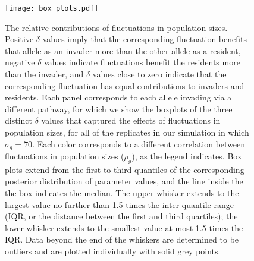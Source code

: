 \begin{figure}[H]
  \centerline{\texttt{[image: box\_plots.pdf]}}
  \caption{The relative contributions of fluctuations in population sizes. Positive $\delta$ values imply that the corresponding fluctuation benefits that allele as an invader more than the other allele as a resident, negative $\delta$ values indicate fluctuations benefit the residents more than the invader, and $\delta$ values close to zero indicate that the corresponding fluctuation has equal contributions to invaders and residents. Each panel corresponds to each allele invading via a different pathway, for which we show the boxplots of the three distinct $\delta$ values that captured the effects of fluctuations in population sizes, for all of the replicates in our simulation in which $\sigma_{g}=70$. Each color corresponds to a different correlation between fluctuations in population sizes ($\rho_{g}$), as the legend indicates. Box plots extend from the first to third quantiles of the corresponding posterior distribution of parameter values, and the line inside the the box indicates the median. The upper whisker extends to the largest value no further than 1.5 times the inter-quantile range (IQR, or the distance between the first and third quartiles); the lower whisker extends to the smallest value at most 1.5 times the IQR. Data beyond the end of the whiskers are determined to be outliers and are plotted individually with solid grey points. }
    \label{fig:boxes}
\end{figure}



